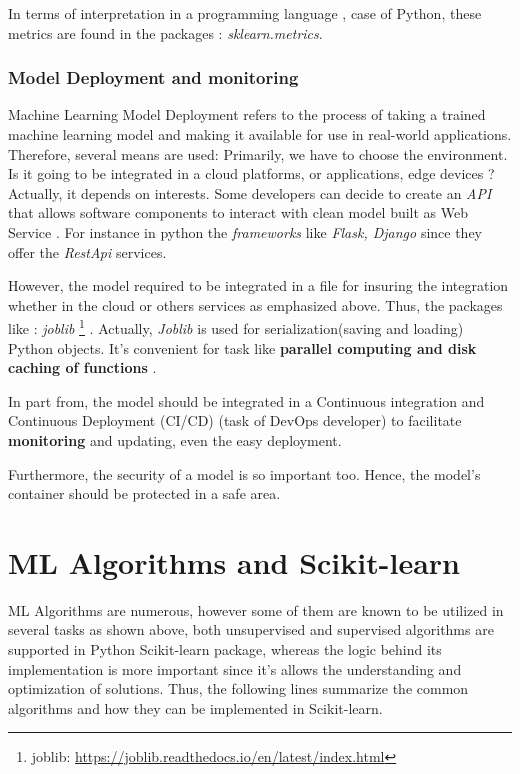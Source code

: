 \documentclass[12pt,a4paper]{report}
\begin{document}
In terms of interpretation in a programming language , case of Python, these metrics are found in the packages : \textit{sklearn.metrics}.\\

\subsubsection{Model Deployment and monitoring}
Machine Learning Model Deployment refers to the process of taking a trained machine learning model and making it available for use in real-world applications. Therefore, several means are used: Primarily, we have to choose the environment. Is it going to be integrated in a cloud platforms, or applications, edge devices ? Actually, it depends on interests. Some developers can decide to create an \textit{API} that allows software components to interact with clean model built as Web Service \cite{singh2021deploy}. For instance in python the \textit{frameworks} like \textit{Flask, Django} since they offer the \textit{RestApi} services. 

However, the model required to be integrated in a file for insuring the integration whether in the cloud or others services as emphasized above. Thus, the packages like : \textit{joblib} \footnote{joblib: \url{https://joblib.readthedocs.io/en/latest/index.html}} . Actually, \textit{Joblib} is used for serialization(saving and loading) Python objects. It's convenient for task like \textbf{parallel computing and disk caching of functions}  \cite{faouzi2020pyts}.

In part from, the model should be integrated in a Continuous integration and Continuous Deployment (CI/CD) (task of DevOps developer) to facilitate \textbf{monitoring} and updating, even the easy deployment. 

Furthermore, the security of a model is so important too. Hence, the model's container should be protected in a safe area. 

\section{ML Algorithms and Scikit-learn}  
ML Algorithms are numerous, however some of them are known to be utilized in several tasks as shown above, both unsupervised and supervised algorithms are supported in Python Scikit-learn package, whereas the logic behind its implementation is more important since it's allows the understanding and optimization of solutions. Thus, the following lines summarize the common algorithms and how they can be implemented in Scikit-learn.
\end{document}
